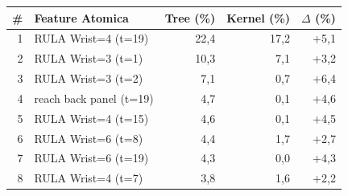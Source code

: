 \begin{tabular*}{\linewidth}{@{}r@{\extracolsep{\fill}}lrrr@{}}
\toprule
\textbf{\#} & \textbf{Feature Atomica} & \textbf{Tree (\%)} & \textbf{Kernel (\%)} & \textbf{$\Delta$ (\%)} \\
\midrule
1 & RULA Wrist=4 (t=19) & 22{,}4 & 17{,}2 & +5{,}1 \\
2 & RULA Wrist=3 (t=1) & 10{,}3 & 7{,}1 & +3{,}2 \\
3 & RULA Wrist=3 (t=2) & 7{,}1 & 0{,}7 & +6{,}4 \\
4 & reach back panel (t=19) & 4{,}7 & 0{,}1 & +4{,}6 \\
5 & RULA Wrist=4 (t=15) & 4{,}6 & 0{,}1 & +4{,}5 \\
6 & RULA Wrist=6 (t=8) & 4{,}4 & 1{,}7 & +2{,}7 \\
7 & RULA Wrist=6 (t=19) & 4{,}3 & 0{,}0 & +4{,}3 \\
8 & RULA Wrist=4 (t=7) & 3{,}8 & 1{,}6 & +2{,}2 \\
\bottomrule
\end{tabular*}
